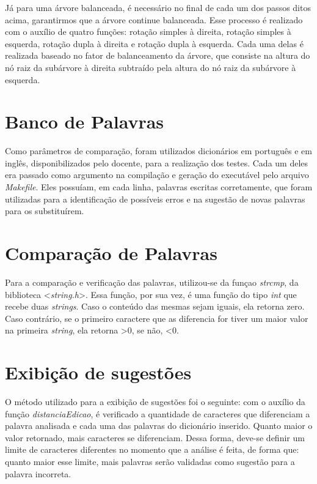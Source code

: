 \documentclass[12pt]{article}
\begin{document}
	Já para uma árvore balanceada, é necessário no final de cada um dos passos ditos acima, garantirmos que a árvore continue balanceada. Esse processo é realizado com o auxílio de quatro funções: rotação simples à direita, rotação simples à esquerda, rotação dupla à direita e rotação dupla à esquerda. Cada uma delas é realizada baseado no fator de balanceamento da árvore, que consiste na altura do nó raiz da subárvore à direita subtraído pela altura do nó raiz da subárvore à esquerda.
	
	\section{Banco de Palavras}
	
	Como parâmetros de comparação, foram utilizados dicionários em português e em inglês, disponibilizados pelo docente, para a realização dos testes. Cada um deles era passado como argumento na compilação e geração do executável pelo arquivo \textit{Makefile}. Eles possuíam, em cada linha, palavras escritas corretamente, que foram utilizadas para a identificação de possíveis erros e na sugestão de novas palavras para os substituírem.
	
	\section{Comparação de Palavras}
	
	Para a comparação e verificação das palavras, utilizou-se da funçao \textit{strcmp}, da biblioteca <\textit{string.h}>. Essa função, por sua vez, é uma função do tipo \textit{int} que recebe duas \textit{strings}. Caso o conteúdo das mesmas sejam iguais, ela retorna zero. Caso contrário, se o primeiro caractere que as diferencia for tiver um maior valor na primeira \textit{string}, ela retorna >0, se não, <0.
	
	\section{Exibição de sugestões}
	
	O método utilizado para a exibição de sugestões foi o seguinte: com o auxílio da função \textit{distanciaEdicao}, é verificado a quantidade de caracteres que diferenciam a palavra analisada e cada uma das palavras do dicionário inserido. Quanto maior o valor retornado, mais caracteres se diferenciam. Dessa forma, deve-se definir um limite de caracteres diferentes no momento que a análise é feita, de forma que: quanto maior esse limite, mais palavras serão validadas como sugestão para a palavra incorreta.  
	
\end{document}
